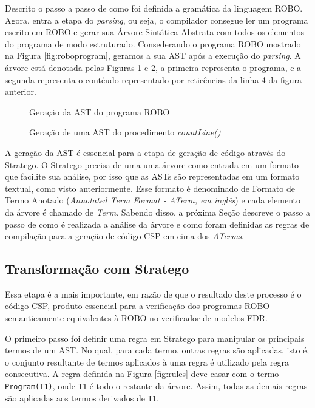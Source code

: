 Descrito o passo a passo de como foi definida a gramática da linguagem ROBO. Agora, entra a etapa do \textit{parsing}, ou seja, o compilador consegue ler um programa escrito em ROBO e gerar sua Árvore Sintática Abstrata com todos os elementos do programa de modo estruturado. Consederando o programa ROBO mostrado na Figura \ref{fig:roboprogram}, geramos a sua AST após a execução do \textit{parsing}. A árvore está denotada pelas Figuras \ref{fig:ast1} e \ref{fig:ast2}, a primeira representa o programa, e a segunda representa o contéudo representado por reticências da linha 4 da figura anterior.

\begin{figure}[h]
\centering
\caption{Geração da AST do programa ROBO}

\label{fig:ast1}
\end{figure}

\begin{figure}[h]
\centering
\caption{Geração de uma AST do procedimento \textit{countLine()}}

\label{fig:ast2}
\end{figure}

A geração da AST é essencial para a etapa de geração de código através do Stratego. O Stratego precisa de uma uma árvore como entrada em um formato que facilite sua análise, por isso que as ASTs são representadas em um formato textual, como visto anteriormente. Esse formato é denominado de Formato de Termo Anotado (\textit{Annotated Term Format - ATerm, em inglês}) e cada elemento da árvore é chamado de \textit{Term}. Sabendo disso, a próxima Seção descreve o passo a passo de como é realizada a análise da árvore e como foram definidas as regras de compilação para a geração de código CSP em cima dos \textit{ATerms}.

\subsection{Transformação com Stratego}

Essa etapa é a mais importante, em razão de que o resultado deste processo é o código CSP, produto essencial para a verificação dos programas ROBO semanticamente equivalentes à ROBO no verificador de modelos FDR.

O primeiro passo foi definir uma regra em Stratego para manipular os principais termos de um AST. No qual, para cada termo, outras regras são aplicadas, isto é, o conjunto resultante de termos aplicados à uma regra é utilizado pela regra consecutiva. A regra definida na Figura \ref{fig:rules} deve casar com o termo \texttt{Program(T1)}, onde \texttt{T1} é todo o restante da árvore. Assim, todas as demais regras são aplicadas aos termos derivados de \texttt{T1}.

